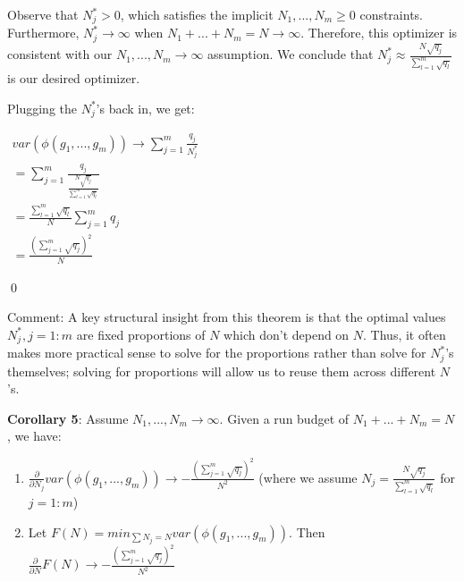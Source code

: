\documentclass{article}
\begin{document}
Observe that $\displaystyle N_{j}^{*}  >0$, which satisfies the implicit $\displaystyle N_{1} ,...,N_{m} \geqslant 0$ constraints. Furthermore, $\displaystyle N_{j}^{*}\rightarrow \infty $ when $\displaystyle N_{1} +...+N_{m} =N\rightarrow \infty $. Therefore, this optimizer is consistent with our $\displaystyle N_{1} ,...,N_{m}\rightarrow \infty $ assumption. We conclude that $\displaystyle N_{j}^{*} \approx \frac{N\sqrt{q_{j}}}{\sum _{l=1}^{m}\sqrt{q_{l}}}$ is our desired optimizer.



Plugging the $\displaystyle N_{j}^{*}$'s back in, we get:

$\displaystyle  \begin{array}{l}
var\left( \phi \left( g_{1} ,...,g_{m}\right)\right)\rightarrow \sum _{j=1}^{m}\frac{q_{j}}{N_{j}^{*}}\\
=\sum _{j=1}^{m}\frac{q_{j}}{\frac{N\sqrt{q_{j}}}{\sum _{l=1}^{m}\sqrt{q_{l}}}}\\
=\frac{\sum _{l=1}^{m}\sqrt{q_{l}}}{N}\sum _{j=1}^{m} q_{j}\\
=\frac{\left(\sum _{j=1}^{m}\sqrt{q_{j}}\right)^{2}}{N}
\end{array}$

\qed 



Comment: A key structural insight from this theorem is that the optimal values $\displaystyle N_{j}^{*} ,j=1:m$ are fixed proportions of $\displaystyle N$ which don't depend on $\displaystyle N$. Thus, it often makes more practical sense to solve for the proportions rather than solve for $\displaystyle N_{j}^{*}$'s themselves; solving for proportions will allow us to reuse them across different $\displaystyle N$'s.



\textbf{Corollary 5}: Assume $\displaystyle N_{1} ,...,N_{m}\rightarrow \infty $. Given a run budget of $\displaystyle N_{1} +...+N_{m} =N$, we have:
\begin{enumerate}
\item $\displaystyle \frac{\partial }{\partial N_{j}} var\left( \phi \left( g_{1} ,...,g_{m}\right)\right)\rightarrow -\frac{\left(\sum _{j=1}^{m}\sqrt{q_{j}}\right)^{2}}{N^{2}}$ (where we assume $\displaystyle N_{j} =\frac{N\sqrt{q_{j}}}{\sum _{l=1}^{m}\sqrt{q_{l}}}$ for $\displaystyle j=1:m$)
\item Let $\displaystyle F\left( N\right) =min_{\sum N_{j} =N} var\left( \phi \left( g_{1} ,...,g_{m}\right)\right)$. Then $\displaystyle \frac{\partial }{\partial N} F\left( N\right)\rightarrow -\frac{\left(\sum _{j=1}^{m}\sqrt{q_{j}}\right)^{2}}{N^{2}}$
\end{enumerate}
\end{document}
